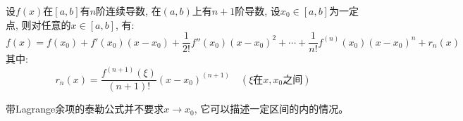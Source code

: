 \begin{theorem}[带Lagrange余项的泰勒公式]
    设$f(x)$在$[a, b]$有$n$阶连续导数, 在$(a, b)$上有$n+1$阶导数, 设$x_0 \in [a, b]$为一定点, 则对任意的$x \in [a, b]$, 有:
    \begin{equation*}
        f(x) = f(x_0) + f'(x_0)(x-x_0) + \frac{1}{2!}f''(x_0)(x-x_0)^2+\cdots+\frac{1}{n!}f^{(n)}(x_0)(x-x_0)^n + r_n(x)
    \end{equation*}
    其中:
    \begin{equation*}
        r_n(x) = \frac{f^{(n+1)}(\xi)}{(n+1)!}(x-x_0)^{(n+1)} \quad (\xi\text{在}x, x_0\text{之间} )
    \end{equation*}
\end{theorem}
\begin{remark}
    带Lagrange余项的泰勒公式并不要求$x \to x_0$, 它可以描述一定区间的内的情况。
\end{remark}
